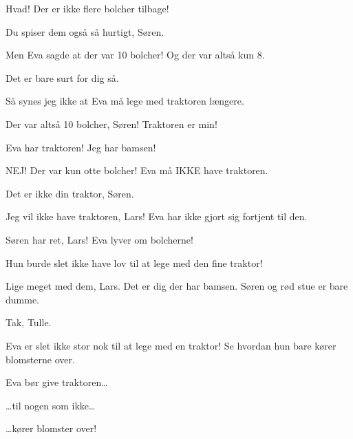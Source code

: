 \documentclass[a4paper,11pt]{article}
\begin{document}
\begin{sketch}





 Hvad!  Der er ikke flere bolcher tilbage!

 Du spiser dem også så hurtigt, Søren.

 Men Eva sagde at der var 10 bolcher!  Og der var altså kun 8.

 Det er bare surt for dig så.

 Så synes jeg ikke at Eva må lege med traktoren længere.

 Der var altså 10 bolcher, Søren!  Traktoren er min!

 Eva har traktoren!  Jeg har bamsen! 

 NEJ!  Der var kun otte bolcher!  Eva må IKKE have traktoren.

 Det er ikke din traktor, Søren.

 Jeg vil ikke have traktoren, Lars!  Eva har ikke gjort sig fortjent til den.


 Søren har ret, Lars!  Eva lyver om bolcherne!

 Hun burde slet ikke have lov til at lege med den fine traktor!

 Lige meget med dem, Lars.    Det er dig der har bamsen.  Søren og rød stue er bare dumme.

 Tak, Tulle.

 Eva er slet ikke stor nok til at lege med en traktor!  Se hvordan hun bare kører blomsterne over.

 Eva bør give traktoren\ldots

 \ldots til nogen som ikke\ldots

 \ldots kører blomster over!


\end{sketch}
\end{document}
